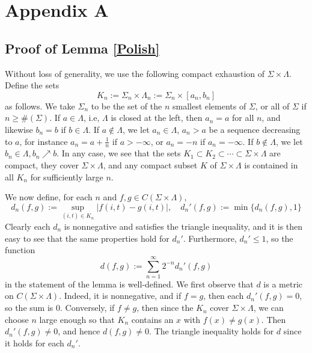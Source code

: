 %

\section{Appendix A} \label{Appendix1}

\subsection{Proof of Lemma \ref{Polish}}

Without loss of generality, we use the following compact exhaustion of $\Sigma\times\Lambda$. Define the sets
\[
K_n := \Sigma_n \times \Lambda_n := \Sigma_n \times [a_n,b_n]
\]
as follows. We take $\Sigma_n$ to be the set of the $n$ smallest elements of $\Sigma$, or all of $\Sigma$ if $n\geq \#(\Sigma)$. If $a\in\Lambda$, i.e, $\Lambda$ is closed at the left, then $a_n=a$ for all $n$, and likewise $b_n=b$ if $b\in\Lambda$. If $a\notin\Lambda$, we let $a_n\in\Lambda$, $a_n>a$ be a sequence decreasing to $a$, for instance $a_n=a+\frac{1}{n}$ if $a>-\infty$, or $a_n=-n$ if $a_n=-\infty$. If $b\notin\Lambda$, we let $b_n\in\Lambda, b_n\nearrow b$. In any case, we see that the sets $K_1\subset K_2\subset\cdots\subset\Sigma\times\Lambda$ are compact, they cover $\Sigma\times\Lambda$, and any compact subset $K$ of $\Sigma\times\Lambda$ is contained in all $K_n$ for sufficiently large $n$.

We now define, for each $n$ and $f,g\in C(\Sigma\times\Lambda)$,
\[
d_n(f,g) := \sup_{(i,t)\in K_n} |f(i,t)-g(i,t)|,\quad d_n'(f,g) := \min\{d_n(f,g), 1\} 
\]
Clearly each $d_n$ is nonnegative and satisfies the triangle inequality, and it is then easy to see that the same properties hold for $d_n'$. Furthermore, $d_n'\leq 1$, so the function
\[
d(f,g) := \sum_{n=1}^\infty 2^{-n} d_n'(f,g)
\]
in the statement of the lemma is well-defined. We first observe that $d$ is a metric on $C(\Sigma\times\Lambda)$. Indeed, it is nonnegative, and if $f=g$, then each $d_n'(f,g)=0$, so the sum is 0. Conversely, if $f\neq g$, then since the $K_n$ cover $\Sigma\times\Lambda$, we can choose $n$ large enough so that $K_n$ contains an $x$ with $f(x)\neq g(x)$. Then $d_n'(f,g)\neq 0$, and hence $d(f,g)\neq 0$. The triangle inequality holds for $d$ since it holds for each $d_n'$.

